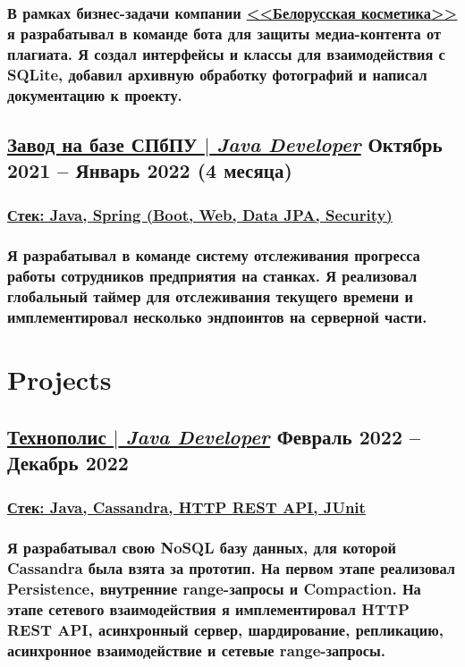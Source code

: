 \documentclass[11pt]{article}
\begin{document}
\subsubsection{В рамках бизнес-задачи компании \href{https://www.wbc-c.ru/}{\underline{<<Белорусская косметика>>}} я разрабатывал в команде бота для защиты медиа-контента от плагиата. Я создал \textbf{интерфейсы и классы для взаимодействия с SQLite}, добавил \textbf{архивную обработку фотографий} и написал документацию к проекту.}
\begin{itemize}
\end{itemize}

\subsection{\href{https://github.com/martyn-fanclub/tracking-system}{\underline{Завод на базе СПбПУ $|$ {\normalfont\textit{Java Developer}}}} \hfill Октябрь 2021 -- Январь 2022 (4 месяца)}
\subsubsection{\underline{\textbf{Стек}: Java, Spring (Boot, Web, Data JPA, Security)}}
\subsubsection{Я разрабатывал в команде \textbf{систему отслеживания прогресса работы сотрудников предприятия на станках}. Я реализовал \textbf{глобальный таймер} для отслеживания текущего времени и имплементировал несколько \textbf{эндпоинтов} на серверной части.}
\begin{itemize}
\end{itemize}

\section{Projects}
\subsection{\href{https://github.com/polis-vk/2022-highload-dht/tree/main/src/main/java/ok/dht/test/kovalenko}{\underline{Технополис $|$ {\normalfont\textit{Java Developer}}}} \hfill Февраль 2022 -- Декабрь 2022}
\subsubsection{\underline{\textbf{Стек}: Java, Cassandra, HTTP REST API, JUnit}}
\subsubsection{Я разрабатывал \textbf{свою NoSQL базу данных}, для которой Cassandra была взята за прототип. На первом этапе реализовал \textbf{Persistence}, \textbf{внутренние range-запросы} и \textbf{Compaction}. На этапе сетевого взаимодействия я имплементировал \textbf{HTTP REST API}, \textbf{асинхронный сервер}, \textbf{шардирование}, \textbf{репликацию}, \textbf{асинхронное взаимодействие} и \textbf{сетевые range-запросы}.}
\begin{itemize}
\end{itemize}
\end{document}
